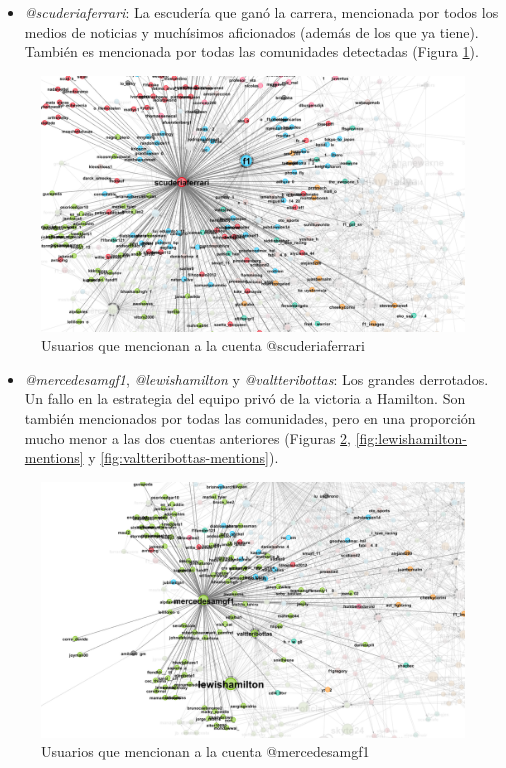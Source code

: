 \begin{itemize}
	\item \textit{@scuderiaferrari}: La escudería que ganó la carrera, mencionada por todos los medios de noticias y muchísimos aficionados (además de los que ya tiene). También es mencionada por todas las comunidades detectadas (Figura \ref{fig:scuderiaferrari-mentions}).
\end{itemize}

\begin{figure}[H]
	\centering
	\includegraphics[width=12cm]{img/scuderiaferrari-mentions}
	\caption{Usuarios que mencionan a la cuenta @scuderiaferrari}
	\label{fig:scuderiaferrari-mentions}
\end{figure}

\begin{itemize}	
	\item \textit{@mercedesamgf1}, \textit{@lewishamilton} y \textit{@valtteribottas}: Los grandes derrotados. Un fallo en la estrategia del equipo privó de la victoria a Hamilton. Son también mencionados por todas las comunidades, pero en una proporción mucho menor a las dos cuentas anteriores (Figuras \ref{fig:mercedesamgf1-mentions}, \ref{fig:lewishamilton-mentions} y \ref{fig:valtteribottas-mentions}).
\end{itemize}

\begin{figure}[H]
	\centering
	\includegraphics[width=12cm]{img/mercedesamgf1-mentions}
	\caption{Usuarios que mencionan a la cuenta @mercedesamgf1}
	\label{fig:mercedesamgf1-mentions}
\end{figure}

